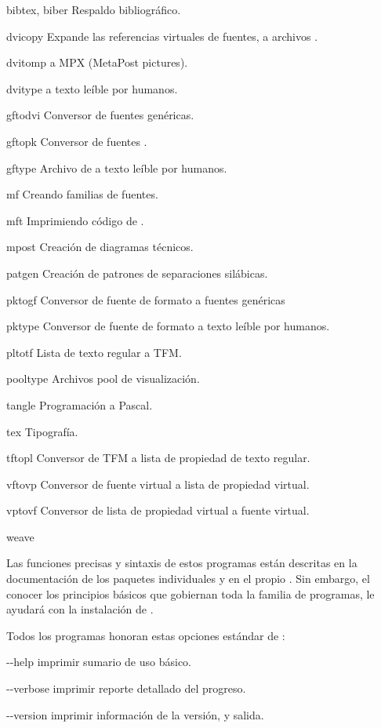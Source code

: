 \documentclass{article}
\begin{document}
\begin{cmddescription}
\item[bibtex, biber]   Respaldo bibliográfico.  
\item[dvicopy]   Expande las referencias virtuales de fuentes, a archivos
	\dvi{}.
\item[dvitomp]   \dvi{} a MPX (MetaPost pictures).
\item[dvitype]   \dvi{} a texto leíble por humanos.
\item[gftodvi]   Conversor de fuentes genéricas.
\item[gftopk]    Conversor de fuentes .
\item[gftype]    Archivo de  a texto leíble por humanos.
\item[mf]        Creando familias de fuentes.
\item[mft]       Imprimiendo código de \MF{}.
\item[mpost]     Creación de diagramas técnicos. 
\item[patgen]    Creación de patrones de separaciones silábicas.
\item[pktogf]    Conversor de fuente de formato  a fuentes genéricas
\item[pktype]    Conversor de fuente de formato  a texto leíble por
humanos. 
\item[pltotf]    Lista de texto regular a TFM. 
\item[pooltype]  Archivos pool \web{} de visualización. 
\item[tangle]    Programación \web{} a Pascal.
\item[tex]       Tipografía.
\item[tftopl]    Conversor de TFM a lista de propiedad de texto regular.
\item[vftovp]    Conversor de fuente virtual a lista de propiedad virtual. 
\item[vptovf]    Conversor de lista de propiedad virtual a fuente virtual.
\item[weave]     \web{} 
\end{cmddescription}

\noindent Las funciones precisas y sintaxis de estos
programas están descritas en la documentación de los
paquetes individuales y en el propio \Webc{}. Sin embargo,
el conocer los principios básicos que gobiernan toda la
familia de programas, le ayudará con la instalación de
\Webc{}. 

Todos los programas honoran estas opciones estándar de \GNU{}:
\begin{ttdescription}
	\item[-{}-help] imprimir sumario de uso básico. 
	\item[-{}-verbose] imprimir reporte detallado del progreso. 
	\item[-{}-version] imprimir información de la versión, y
		salida.
\end{ttdescription}
\end{document}
